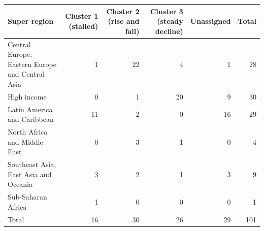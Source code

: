 \begin{tabular}{lrrrrr}
\toprule
Super region & Cluster 1 (stalled) & Cluster 2 (rise and fall) & Cluster 3 (steady decline) & Unassigned & Total \\
\midrule
Central Europe, Eastern Europe and Central Asia &  1 & 22 &  4 &  1 &  28 \\
High income &  0 &  1 & 20 &  9 &  30 \\
Latin America and Caribbean & 11 &  2 &  0 & 16 &  29 \\
North Africa and Middle East &  0 &  3 &  1 &  0 &   4 \\
Southeast Asia, East Asia and Oceania &  3 &  2 &  1 &  3 &   9 \\
Sub-Saharan Africa &  1 &  0 &  0 &  0 &   1 \\
Total & 16 & 30 & 26 & 29 & 101 \\
\bottomrule
\end{tabular}
